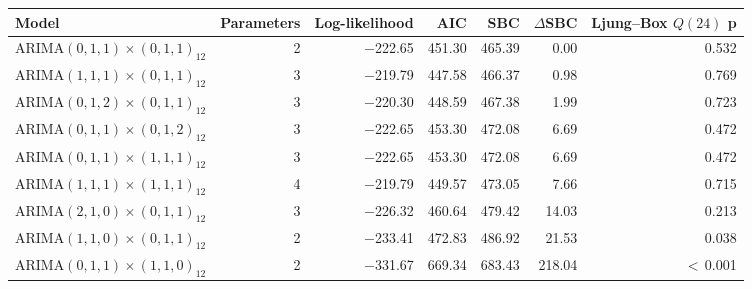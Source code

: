 \begin{tabular}{lrrrrrr}
\toprule
Model & Parameters & Log-likelihood & AIC & SBC & $\Delta$SBC & Ljung--Box $Q(24)$ p\\
\midrule
ARIMA$(0,1,1)\times(0,1,1)_{12}$ & 2 & $-$222.65 & 451.30 & 465.39 & 0.00 & 0.532\\
ARIMA$(1,1,1)\times(0,1,1)_{12}$ & 3 & $-$219.79 & 447.58 & 466.37 & 0.98 & 0.769\\
ARIMA$(0,1,2)\times(0,1,1)_{12}$ & 3 & $-$220.30 & 448.59 & 467.38 & 1.99 & 0.723\\
ARIMA$(0,1,1)\times(0,1,2)_{12}$ & 3 & $-$222.65 & 453.30 & 472.08 & 6.69 & 0.472\\
ARIMA$(0,1,1)\times(1,1,1)_{12}$ & 3 & $-$222.65 & 453.30 & 472.08 & 6.69 & 0.472\\
ARIMA$(1,1,1)\times(1,1,1)_{12}$ & 4 & $-$219.79 & 449.57 & 473.05 & 7.66 & 0.715\\
ARIMA$(2,1,0)\times(0,1,1)_{12}$ & 3 & $-$226.32 & 460.64 & 479.42 & 14.03 & 0.213\\
ARIMA$(1,1,0)\times(0,1,1)_{12}$ & 2 & $-$233.41 & 472.83 & 486.92 & 21.53 & 0.038\\
ARIMA$(0,1,1)\times(1,1,0)_{12}$ & 2 & $-$331.67 & 669.34 & 683.43 & 218.04 & $<$\,0.001\\
\bottomrule
\end{tabular}
